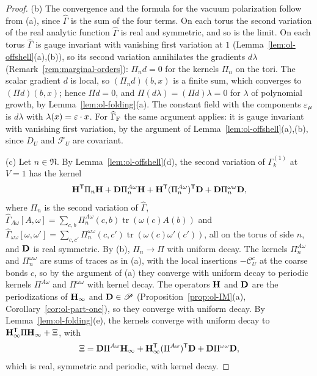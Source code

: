 \begin{proof}
(b) The convergence and the formula for the vacuum polarization follow from (a), since $\widehat\Gamma$ is the sum of the four terms. On each torus the second variation of the real analytic function $\widehat\Gamma$ is real and symmetric, and so is the limit. On each torus $\widehat\Gamma$ is gauge invariant with vanishing first variation at $1$ (Lemma~\ref{lem:ol-offshell}(a),(b)), so its second variation annihilates the gradients $d\lambda$ (Remark~\ref{rem:marginal-orders}): $\Pi_nd=0$ for the kernels $\Pi_n$ on the tori. The scalar gradient $d$ is local, so $(\Pi_nd)(b,x)$ is a finite sum, which converges to $(\Pi d)(b,x)$; hence $\Pi d=0$, and $\Pi(d\lambda)=(\Pi d)\lambda=0$ for $\lambda$ of polynomial growth, by Lemma~\ref{lem:ol-folding}(a). The constant field with the components $\varepsilon_\mu$ is $d\lambda$ with $\lambda(x)=\varepsilon\cdot x$. For $\widehat\Gamma_{\rm F}$ the same argument applies: it is gauge invariant with vanishing first variation, by the argument of Lemma~\ref{lem:ol-offshell}(a),(b), since $D_U$ and $\mathcal F_U$ are covariant.

(c) Let $n\in\mathfrak N$. By Lemma~\ref{lem:ol-offshell}(d), the second variation of $\Gamma^{(1)}_k$ at $V=1$ has the kernel
\[
\mathbf H^{\sf T}\Pi_n\mathbf H+\mathbf D\Pi^{A\omega}_n\mathbf H+\mathbf H^{\sf T}(\Pi^{A\omega}_n)^{\sf T}\mathbf D+\mathbf D\Pi^{\omega\omega}_n\mathbf D,
\]
where $\Pi_n$ is the second variation of $\widehat\Gamma$, $\widehat\Gamma_{A\omega}[A,\omega]=\sum_{c,b}\Pi^{A\omega}_n(c,b)\operatorname{tr}(\omega(c)A(b))$ and $\widehat\Gamma_{\omega\omega}[\omega,\omega']=\sum_{c,c'}\Pi^{\omega\omega}_n(c,c')\operatorname{tr}(\omega(c)\omega'(c'))$, all on the torus of side $n$, and $\mathbf D$ is real symmetric. By (b), $\Pi_n\to\Pi$ with uniform decay. The kernels $\Pi^{A\omega}_n$ and $\Pi^{\omega\omega}_n$ are sums of traces as in (a), with the local insertions $-\mathcal C^c_U$ at the coarse bonds $c$, so by the argument of (a) they converge with uniform decay to periodic kernels $\Pi^{A\omega}$ and $\Pi^{\omega\omega}$ with kernel decay. The operators $\mathbf H$ and $\mathbf D$ are the periodizations of $\mathbf H_\infty$ and $\mathbf D\in\mathscr P$ (Proposition~\ref{prop:ol-IM}(a), Corollary~\ref{cor:ol-part-one}), so they converge with uniform decay. By Lemma~\ref{lem:ol-folding}(e), the kernels converge with uniform decay to $\mathbf H_\infty^{\sf T}\Pi\mathbf H_\infty+\Xi$, with
\[
\Xi=\mathbf D\Pi^{A\omega}\mathbf H_\infty+\mathbf H_\infty^{\sf T}(\Pi^{A\omega})^{\sf T}\mathbf D+\mathbf D\Pi^{\omega\omega}\mathbf D,
\]
which is real, symmetric and periodic, with kernel decay.


\end{proof}
